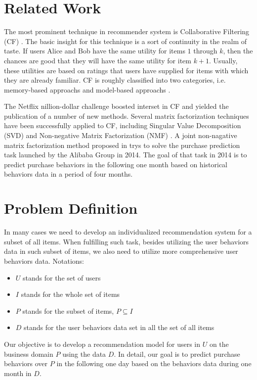 \documentclass{llncs}
\begin{document}
\section{Related Work}
The most prominent technique in recommender system is
Collaborative Filtering (CF) \cite{Su2009A}.
The basic insight for this technique is a sort of continuity in the realm of taste.
If users Alice and Bob have the same utility for items $1$ through $k$,
then the chances are good that they will have the same utility for item $k + 1$.
Usually, these utilities are based on ratings that users have supplied for items
with which they are already familiar.
CF is roughly classified into two categories,
i.e. memory-based approachs \cite{Linden2003Amazon, Wang2006Unifying}
and model-based approachs \cite{Adomavicius2005Toward, Koren2009MATRIX}.

The Netflix nillion-dollar challenge boosted interset in CF and yielded
the publication of a number of new methods.
Several matrix factorization techniques have been successfully applied to CF,
including Singular Value Decomposition (SVD) \cite{Paterek2007Improving}
and Non-negative Matrix Factorization (NMF) \cite{Lee1999Learning}.
A joint non-nagative matrix factorization method proposed in \cite{Ju2014Modeling} 
trys to solve the purchase prediction task launched by the Alibaba Group in 2014.
The goal of that task in 2014 is to predict purchase behaviors in the following one month
based on historical behaviors data in a period of four months.


\section{Problem Definition}
In many cases we need to develop an individualized recommendation system
for a subset of all items. When fulfilling such task,
besides utilizing the user behaviors data
in such subset of items, we also need to utilize
more comprehensive user behaviors data.
Notations:
\begin{itemize}
	\item $U$ stands for the set of users
	\item $I$ stands for the whole set of items
	\item $P$ stands for the subset of items, $P \subseteq I$
	\item $D$ stands for the user behaviors data set in all the set of all items
\end{itemize}

Our objective is to develop a recommendation model
for users in $U$ on the business domain $P$ using the data $D$.
In detail, our goal is to predict purchase behaviors over $P$
in the following one day based on the behaviors data during one month in $D$.
\end{document}
